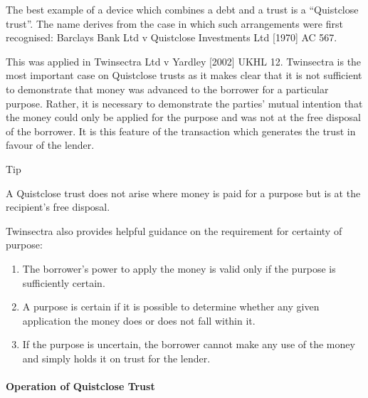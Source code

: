 \documentclass[
]{article}
\providecommand{\tightlist}{%
  \setlength{\itemsep}{0pt}\setlength{\parskip}{0pt}}
\newenvironment{env-2b801cbb-a953-4b0a-aa1f-4f4d37e46523}
{
    \savenotes\tcolorbox[blanker,breakable,left=5pt,borderline west={2pt}{-4pt}{cyan}]
}
{
    \endtcolorbox\spewnotes
}
\begin{document}
The best example of a device which combines a debt and a trust is a
``Quistclose trust''. The name derives from the case in which such
arrangements were first recognised: Barclays Bank Ltd v Quistclose
Investments Ltd {[}1970{]} AC 567.

This was applied in Twinsectra Ltd v Yardley {[}2002{]} UKHL 12.
Twinsectra is the most important case on Quistclose trusts as it makes
clear that it is not sufficient to demonstrate that money was advanced
to the borrower for a particular purpose. Rather, it is necessary to
demonstrate the parties' mutual intention that the money could only be
applied for the purpose and was not at the free disposal of the
borrower. It is this feature of the transaction which generates the
trust in favour of the lender.

\begin{env-2b801cbb-a953-4b0a-aa1f-4f4d37e46523}

Tip

A Quistclose trust does not arise where money is paid for a purpose but
is at the recipient's free disposal.

\end{env-2b801cbb-a953-4b0a-aa1f-4f4d37e46523}

Twinsectra also provides helpful guidance on the requirement for
certainty of purpose:

\begin{enumerate}
\tightlist
\item
  The borrower's power to apply the money is valid only if the purpose
  is sufficiently certain.
\item
  A purpose is certain if it is possible to determine whether any given
  application the money does or does not fall within it.
\item
  If the purpose is uncertain, the borrower cannot make any use of the
  money and simply holds it on trust for the lender.
\end{enumerate}

\hypertarget{operation-of-quistclose-trust}{%
\paragraph{Operation of Quistclose
Trust}\label{operation-of-quistclose-trust}}
\end{document}
